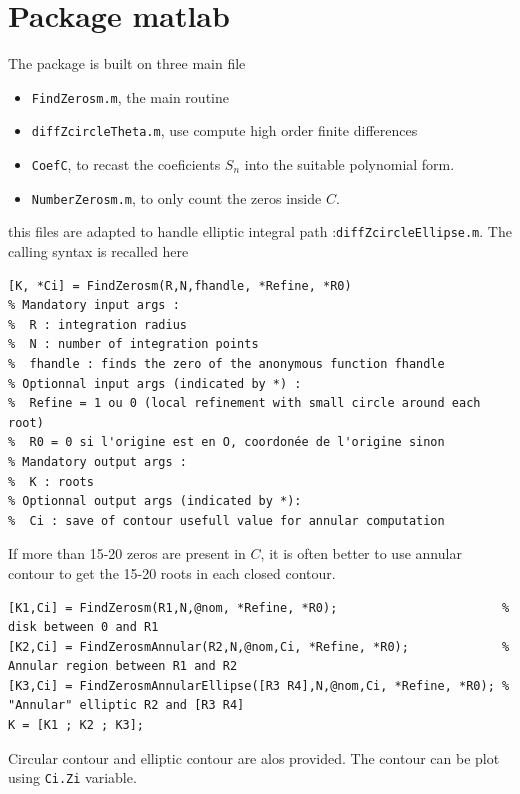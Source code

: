 \documentclass[a4paper,10pt]{article}
\begin{document}
\section{Package matlab}
The package is built on three main file
\begin{itemize}
\item \texttt{FindZerosm.m}, the main routine
\item \texttt{diffZcircleTheta.m}, use compute high order finite differences
\item \texttt{CoefC}, to recast the coeficients $S_n$ into the suitable polynomial form.
\item \texttt{NumberZerosm.m}, to only count the zeros inside $C$.
\end{itemize}
this files are adapted to handle elliptic integral path :\texttt{diffZcircleEllipse.m}. The calling syntax is recalled here
\begin{verbatim}
[K, *Ci] = FindZerosm(R,N,fhandle, *Refine, *R0)
% Mandatory input args :
%  R : integration radius
%  N : number of integration points
%  fhandle : finds the zero of the anonymous function fhandle
% Optionnal input args (indicated by *) :
%  Refine = 1 ou 0 (local refinement with small circle around each root)
%  R0 = 0 si l'origine est en O, coordonée de l'origine sinon
% Mandatory output args :
%  K : roots
% Optionnal output args (indicated by *):
%  Ci : save of contour usefull value for annular computation
\end{verbatim}
If more than 15-20 zeros are present in $C$, it is often better to use annular contour to get the 15-20 roots in each closed contour.
\begin{verbatim}
[K1,Ci] = FindZerosm(R1,N,@nom, *Refine, *R0);                       % disk between 0 and R1
[K2,Ci] = FindZerosmAnnular(R2,N,@nom,Ci, *Refine, *R0);             % Annular region between R1 and R2
[K3,Ci] = FindZerosmAnnularEllipse([R3 R4],N,@nom,Ci, *Refine, *R0); % "Annular" elliptic R2 and [R3 R4]
K = [K1 ; K2 ; K3];
\end{verbatim}
Circular contour and elliptic contour are alos provided. The contour can be plot using \texttt{Ci.Zi} variable.%
\end{document}
